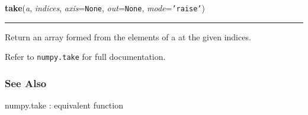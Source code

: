     \label{numpy:ndarray:take}

    \vspace{0.5ex}

    \begin{boxedminipage}{\textwidth}

    \raggedright \textbf{take}(\textit{a}, \textit{indices}, \textit{axis}=\texttt{None}, \textit{out}=\texttt{None}, \textit{mode}=\texttt{'raise'})

    \vspace{-1.5ex}

    \rule{\textwidth}{0.5\fboxrule}

Return an array formed from the elements of a at the given indices.

Refer to \texttt{numpy.take} for full documentation.



\hypertarget{see-also}{}
\subsubsection*{See Also}

numpy.take : equivalent function
    \vspace{1ex}

    \end{boxedminipage}

    \label{numpy:ndarray:tofile}

    \vspace{0.5ex}

